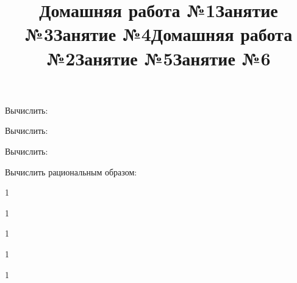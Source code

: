 \newpage
\title{Домашняя работа №1}
\begin{listofex}
	\item Вычислить:
	\begin{enumcols}[itemcolumns=2]
		\item {}
		\item {}
	\end{enumcols}
	\item Вычислить:
	\begin{enumcols}[itemcolumns=2]
		\item {}
		\item {}
	\end{enumcols}
	\item Вычислить:
	\begin{enumcols}[itemcolumns=1]
		\item {}
		\item {}
		\item {}
	\end{enumcols}
	\item Вычислить рациональным образом:
	\begin{enumcols}[itemcolumns=2]
		\item {}
		\item {}
	\end{enumcols}
	\item {}
\end{listofex}
\newpage
\title{Занятие №3}
\begin{listofex}
	\item 1
	
\end{listofex}
\newpage
\title{Занятие №4}
\begin{listofex}
	\item 1
	
\end{listofex}
\newpage
\title{Домашняя работа №2}
\begin{listofex}
	\item 1
	
\end{listofex}
\newpage
\title{Занятие №5}
\begin{listofex}
	\item 1
	
\end{listofex}
\newpage
\title{Занятие №6}
\begin{listofex}
	\item 1
	
\end{listofex}
